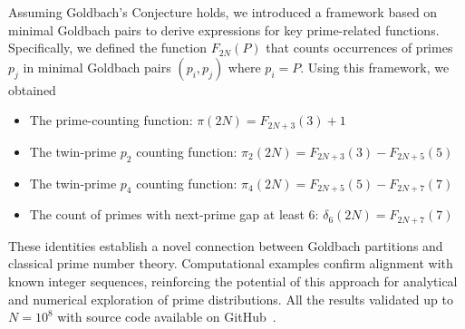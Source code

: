 Assuming Goldbach's Conjecture holds, we introduced a framework based on minimal
Goldbach pairs to derive expressions for key prime-related functions.
Specifically, we defined the function $F_{2N}(P)$ that counts occurrences of primes $p_j$ in minimal Goldbach
pairs $(p_i, p_j)$ where $p_i = P$.
Using this framework, we obtained

\begin{itemize}
    \item The prime-counting function: $\pi(2N) = F_{2N+3}(3) + 1$
    \item The twin-prime $p_2$ counting function: $\pi_2(2N) = F_{2N+3}(3) - F_{2N+5}(5)$
    \item The twin-prime $p_4$ counting function: $\pi_4 (2N) = F_{2N+5}(5) - F_{2N+7}(7)$
    \item The count of primes with next-prime gap at least 6: $\delta_6(2N) = F_{2N+7}(7)$
\end{itemize}

These identities establish a novel connection between Goldbach partitions and classical prime number theory.
Computational examples confirm alignment with known integer sequences, reinforcing the potential
of this approach for analytical and numerical exploration of prime distributions.
All the results validated up to $N=10^8$ with source code available on
GitHub~\cite{kolosovpetro2025minimalgoldbachpairs}.
